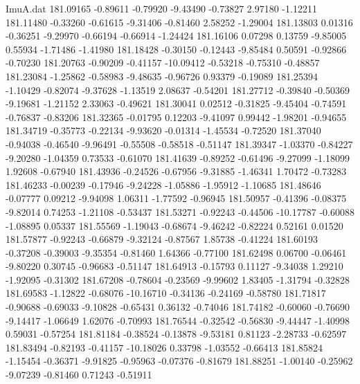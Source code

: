 \begin{filecontents}{ImuA.dat}
 181.09165   -0.89611   -0.79920   -9.43490   -0.73827    2.97180   -1.12211
 181.11480   -0.33260   -0.61615   -9.31406   -0.81460    2.58252   -1.29004
 181.13803    0.01316   -0.36251   -9.29970   -0.66194   -0.66914   -1.24424
 181.16106    0.07298    0.13759   -9.85005    0.55934   -1.71486   -1.41980
 181.18428   -0.30150   -0.12443   -9.85484    0.50591   -0.92866   -0.70230
 181.20763   -0.90209   -0.41157  -10.09412   -0.53218   -0.75310   -0.48857
 181.23084   -1.25862   -0.58983   -9.48635   -0.96726    0.93379   -0.19089
 181.25394   -1.10429   -0.82074   -9.37628   -1.13519    2.08637   -0.54201
 181.27712   -0.39840   -0.50369   -9.19681   -1.21152    2.33063   -0.49621
 181.30041    0.02512   -0.31825   -9.45404   -0.74591   -0.76837   -0.83206
 181.32365   -0.01795    0.12203   -9.41097    0.99442   -1.98201   -0.94655
 181.34719   -0.35773   -0.22134   -9.93620   -0.01314   -1.45534   -0.72520
 181.37040   -0.94038   -0.46540   -9.96491   -0.55508   -0.58518   -0.51147
 181.39347   -1.03370   -0.84227   -9.20280   -1.04359    0.73533   -0.61070
 181.41639   -0.89252   -0.61496   -9.27099   -1.18099    1.92608   -0.67940
 181.43936   -0.24526   -0.67956   -9.31885   -1.46341    1.70472   -0.73283
 181.46233   -0.00239   -0.17946   -9.24228   -1.05886   -1.95912   -1.10685
 181.48646   -0.07777    0.09212   -9.94098    1.06311   -1.77592   -0.96945
 181.50957   -0.41396   -0.08375   -9.82014    0.74253   -1.21108   -0.53437
 181.53271   -0.92243   -0.44506  -10.17787   -0.60088   -1.08895    0.05337
 181.55569   -1.19043   -0.68674   -9.46242   -0.82224    0.52161    0.01520
 181.57877   -0.92243   -0.66879   -9.32124   -0.87567    1.85738   -0.41224
 181.60193   -0.37208   -0.39003   -9.35354   -0.81460    1.64366   -0.77100
 181.62498    0.06700   -0.06461   -9.80220    0.30745   -0.96683   -0.51147
 181.64913   -0.15793    0.11127   -9.34038    1.29210   -1.92095   -0.31302
 181.67208   -0.78604   -0.23569   -9.99602    1.83405   -1.31794   -0.32828
 181.69583   -1.12822   -0.68076  -10.16710   -0.34136   -0.24169   -0.58780
 181.71817   -0.90688   -0.69033   -9.10828   -0.65431    0.36132   -0.74046
 181.74182   -0.60060   -0.76690   -9.14417   -1.06649    1.62076   -0.70993
 181.76544   -0.32542   -0.56830   -9.44447   -1.40998    0.59031   -0.57254
 181.81184   -0.38524   -0.13878   -9.53181    0.81123   -2.28733   -0.62597
 181.83494   -0.82193   -0.41157  -10.18026    0.33798   -1.03552   -0.66413
 181.85824   -1.15454   -0.36371   -9.91825   -0.95963   -0.07376   -0.81679
 181.88251   -1.00140   -0.25962   -9.07239   -0.81460    0.71243   -0.51911

\end{filecontents}
